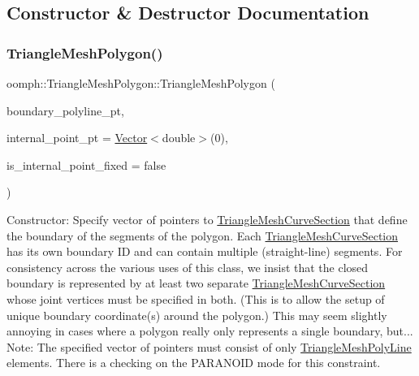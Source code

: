 \subsection{Constructor \& Destructor Documentation}
\mbox{\label{classoomph_1_1TriangleMeshPolygon_a779958aa48492a70dd39c3d323e43aca}} 
\subsubsection{\texorpdfstring{Triangle\+Mesh\+Polygon()}{TriangleMeshPolygon()}}
{\footnotesize\ttfamily oomph\+::\+Triangle\+Mesh\+Polygon\+::\+Triangle\+Mesh\+Polygon (\begin{DoxyParamCaption}\item[{const \hyperlink{classoomph_1_1Vector}{Vector}$<$ \hyperlink{classoomph_1_1TriangleMeshCurveSection}{Triangle\+Mesh\+Curve\+Section} $\ast$$>$ \&}]{boundary\+\_\+polyline\+\_\+pt,  }\item[{const \hyperlink{classoomph_1_1Vector}{Vector}$<$ double $>$ \&}]{internal\+\_\+point\+\_\+pt = {\ttfamily \hyperlink{classoomph_1_1Vector}{Vector}$<$double$>$(0)},  }\item[{const bool \&}]{is\+\_\+internal\+\_\+point\+\_\+fixed = {\ttfamily false} }\end{DoxyParamCaption})}



Constructor\+: Specify vector of pointers to \hyperlink{classoomph_1_1TriangleMeshCurveSection}{Triangle\+Mesh\+Curve\+Section} that define the boundary of the segments of the polygon. Each \hyperlink{classoomph_1_1TriangleMeshCurveSection}{Triangle\+Mesh\+Curve\+Section} has its own boundary ID and can contain multiple (straight-\/line) segments. For consistency across the various uses of this class, we insist that the closed boundary is represented by at least two separate \hyperlink{classoomph_1_1TriangleMeshCurveSection}{Triangle\+Mesh\+Curve\+Section} whose joint vertices must be specified in both. (This is to allow the setup of unique boundary coordinate(s) around the polygon.) This may seem slightly annoying in cases where a polygon really only represents a single boundary, but... Note\+: The specified vector of pointers must consist of only \hyperlink{classoomph_1_1TriangleMeshPolyLine}{Triangle\+Mesh\+Poly\+Line} elements. There is a checking on the P\+A\+R\+A\+N\+O\+ID mode for this constraint. 

